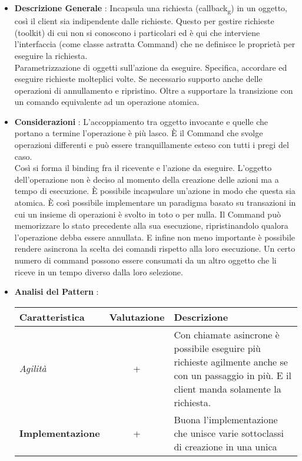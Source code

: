 {{{			\begin{itemize}\itemsep1pt
				\item \textbf{Descrizione Generale} :  Incapsula una richiesta (callback\textsubscript{g}) in un oggetto, così il client sia indipendente dalle richieste. Questo per gestire richieste (toolkit) di cui non si conoscono i particolari ed è qui che interviene l'interfaccia (come classe astratta Command) che ne definisce le proprietà per eseguire la richiesta.\\
				Parametrizzazione di oggetti sull'azione da eseguire. Specifica, accordare ed eseguire richieste molteplici volte. Se necessario supporto anche delle operazioni di annullamento e ripristino. Oltre a supportare la transizione con un comando equivalente ad un operazione atomica.
				\item \textbf{Considerazioni} : L'accoppiamento tra oggetto invocante e quelle che portano a termine l'operazione è più lasco. È il Command che svolge operazioni differenti e può essere tranquillamente esteso con tutti i pregi del caso.\\
				Così si forma il binding  fra il ricevente e l'azione da eseguire. L'oggetto dell'operazione non è deciso al momento della creazione delle azioni ma a tempo di esecuzione. È possibile incapsulare un'azione in modo che questa sia atomica. È così possibile implementare un paradigma basato su transazioni in cui un insieme di operazioni è svolto in toto o per nulla. Il Command può memorizzare lo stato precedente alla sua esecuzione, ripristinandolo qualora l'operazione debba essere annullata. E infine non meno importante è possibile rendere asincrona la scelta dei comandi rispetto alla loro esecuzione. Un certo numero di command possono essere consumati da un altro oggetto che li riceve in un tempo diverso dalla loro selezione.
				\item \textbf{Analisi del Pattern} : 
				\small %
				{\renewcommand\arraystretch{1.2} %
					\begin{tabular}{|l|c|l|}
						\hline
						{\textbf{Caratteristica}}&{\textbf{Valutazione}}&{\textbf{Descrizione}}\\
						\hline
						\textit{Agilità} & + & Con chiamate asincrone è possibile eseguire più richieste agilmente anche se con un passaggio in più. E il client manda solamente la richiesta. \\
						\hline
						\textbf{Implementazione} & + & Buona l'implementazione che unisce varie sottoclassi di creazione in una unica \\

\end{tabular}}
\end{itemize}}}}
